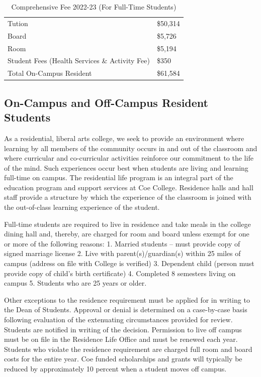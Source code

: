 \documentclass[
  letterpaper,
]{scrbook}
\renewcommand\toprule[2]\relax
\renewcommand\bottomrule[2]\relax
\begin{document}
\begin{longtable}[]{@{}
  >{\raggedright\arraybackslash}p{}
  >{\raggedleft\arraybackslash}p{}@{}}
\caption{Comprehensive Fee 2022-23 (For Full-Time
Students)}\tabularnewline
\toprule\noalign{}
\endfirsthead
\endhead
\bottomrule\noalign{}
\endlastfoot
Tution & \$50,314 \\
Board & \$5,726 \\
Room & \$5,194 \\
Student Fees (Health Services \& Activity Fee) & \$350 \\
Total On-Campus Resident & \$61,584 \\
\end{longtable}

\hypertarget{on-campus-and-off-campus-resident-students}{%
\subsection{On-Campus and Off-Campus Resident
Students}\label{on-campus-and-off-campus-resident-students}}

As a residential, liberal arts college, we seek to provide an
environment where learning by all members of the community occurs in and
out of the classroom and where curricular and co-curricular activities
reinforce our commitment to the life of the mind. Such experiences occur
best when students are living and learning full-time on campus. The
residential life program is an integral part of the education program
and support services at Coe College. Residence halls and hall staff
provide a structure by which the experience of the classroom is joined
with the out-of-class learning experience of the student.

Full-time students are required to live in residence and take meals in
the college dining hall and, thereby, are charged for room and board
unless exempt for one or more of the following reasons: 1. Married
students -- must provide copy of signed marriage license 2. Live with
parent(s)/guardian(s) within 25 miles of campus (address on file with
College is verified) 3. Dependent child (person must provide copy of
child's birth certificate) 4. Completed 8 semesters living on campus 5.
Students who are 25 years or older.

Other exceptions to the residence requirement must be applied for in
writing to the Dean of Students. Approval or denial is determined on a
case-by-case basis following evaluation of the extenuating circumstances
provided for review. Students are notified in writing of the decision.
Permission to live off campus must be on file in the Residence Life
Office and must be renewed each year. Students who violate the residence
requirement are charged full room and board costs for the entire year.
Coe funded scholarships and grants will typically be reduced by
approximately 10 percent when a student moves off campus.
\end{document}
